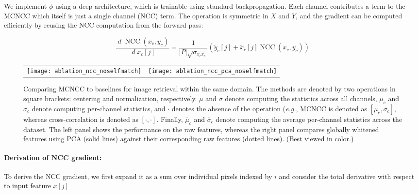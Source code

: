 \documentclass[twocolumn]{svjour3}           %
\newcommand{\eg}{\emph{e.g.}}
\DeclareMathOperator{\total}{\mathit{d}}
\begin{document}
We implement $\phi$ using a deep architecture, which is trainable using
standard backpropagation. Each channel contributes a term to the MCNCC
which itself is just a single channel (NCC) term.  The operation is symmetric in
$X$ and $Y$, and the gradient can be computed efficiently by reusing the NCC
computation from the forward pass:

{\scriptsize
\begin{equation}
  \frac{\total\operatorname{NCC}(x_c,y_c)}{\total x_c[j]} =
  \frac{1}{|P|\sqrt{\sigma_{x_cx_c}}}
  ( \tilde{y}_c[j]+ \tilde{x}_c[j] \operatorname{NCC}(x_c,y_c) )
\end{equation}}

\begin{figure*}[t]
  \begin{center}
  \begin{tabular}{cc}
    \texttt{[image: ablation\_ncc\_noselfmatch]} &
    \texttt{[image: ablation\_ncc\_pca\_noselfmatch]}
  \end{tabular}\vspace{-2mm}
  \end{center}
  \caption{Comparing MCNCC to baselines for image retrieval within the same
  domain. The methods are denoted by two
  operations in square brackets: centering and normalization,
  respectively. $\mu$ and $\sigma$ denote computing the statistics across all
  channels, $\mu_c$ and $\sigma_c$ denote computing per-channel statistics, and
  $\cdot$ denotes the absence of the operation (\eg, MCNCC is denoted as
  $[\mu_c,\sigma_c]$, whereas cross-correlation is denoted as $[\cdot,\cdot]$.
  Finally, $\bar{\mu}_c$ and $\bar{\sigma}_c$ denote computing the average
  per-channel statistics across the dataset.
  The left panel shows the performance on the raw features, whereas the
  right panel compares globally whitened features using PCA (solid lines) against
  their corresponding raw features (dotted lines). (Best viewed in color.)}
  \label{fig:ncc_ablation}
\end{figure*}


\paragraph{Derivation of NCC gradient:} To derive the NCC gradient, we first
expand it as a sum over individual pixels indexed by $i$ and consider the total
derivative with respect to input feature $x[j]$
\end{document}
